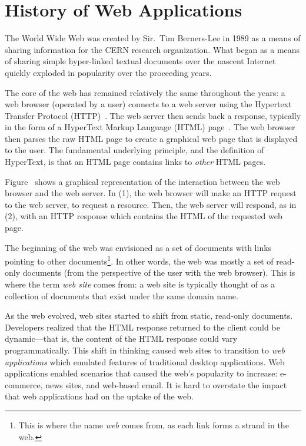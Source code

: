 \section{History of Web Applications}

The World Wide Web was created by Sir.\ Tim Berners-Lee in 1989 as a
means of sharing information for the CERN research organization. What
began as a means of sharing simple hyper-linked textual documents over
the nascent Internet quickly exploded in popularity over the
proceeding years.

The core of the web has remained relatively the same throughout the
years: a web browser (operated by a user) connects to a web server
using the Hypertext Transfer Protocol (HTTP)~\cite{fielding99:http11}.
The web server then sends back a response, typically in the form of a
HyperText Markup Language (HTML) page~\cite{berjon14:html5}. The web
browser then parses the raw HTML page to create a graphical web page that
is displayed to the user. The fundamental underlying principle, and
the definition of HyperText, is that an HTML page contains links to
\emph{other} HTML pages.



Figure~ shows a graphical
representation of the interaction between the web browser and the web
server. In (1), the web browser will make an HTTP request to the web
server, to request a resource. Then, the web server will respond, as
in (2), with an HTTP response which contains the HTML of the requested
web page.

The beginning of the web was envisioned as a set of documents with
links pointing to other documents\footnote{This is where the name
  \emph{web} comes from, as each link forms a strand in the web.}. In
other words, the web was mostly a set of read-only documents (from the
perspective of the user with the web browser). This is where the term
\emph{web site} comes from: a web site is typically thought of as a
collection of documents that exist under the same domain name.

As the web evolved, web sites started to shift from static, read-only
documents. Developers realized that the HTML response returned to the
client could be dynamic---that is, the content of the HTML response
could vary programmatically. This shift in thinking caused web sites to
transition to \emph{web applications} which emulated features of
traditional desktop applications. Web applications enabled scenarios
that caused the web's popularity to increase: e-commerce, news sites, and
web-based email. It is hard to overstate the impact that web
applications had on the uptake of the web. 

